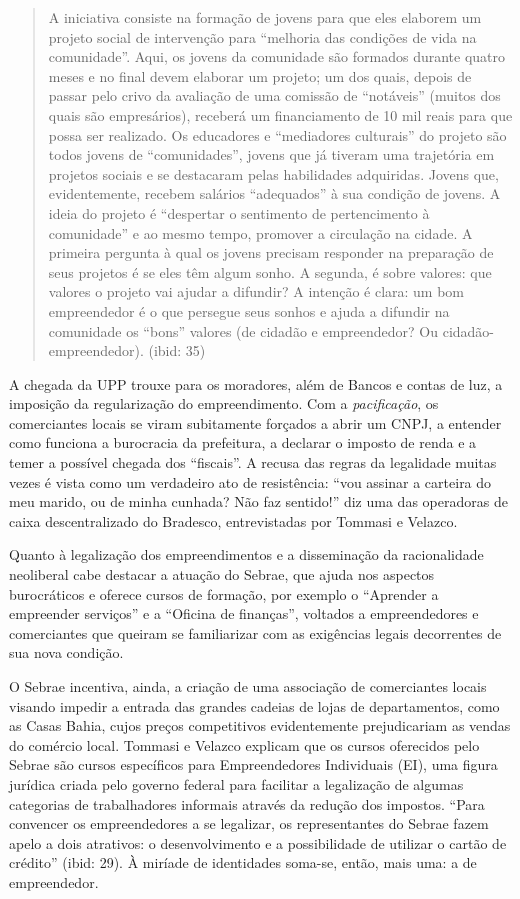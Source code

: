\begin{quote}
A iniciativa consiste na formação de jovens para que eles elaborem um
projeto social de intervenção para ``melhoria das condições de vida na
comunidade''. Aqui, os jovens da comunidade são formados durante quatro
meses e no final devem elaborar um projeto; um dos quais, depois de
passar pelo crivo da avaliação de uma comissão de ``notáveis'' (muitos
dos quais são empresários), receberá um financiamento de 10 mil reais
para que possa ser realizado. Os educadores e ``mediadores culturais''
do projeto são todos jovens de ``comunidades'', jovens que já tiveram
uma trajetória em projetos sociais e se destacaram pelas habilidades
adquiridas. Jovens que, evidentemente, recebem salários ``adequados'' à
sua condição de jovens. A ideia do projeto é ``despertar o sentimento de
pertencimento à comunidade'' e ao mesmo tempo, promover a circulação na
cidade. A primeira pergunta à qual os jovens precisam responder na
preparação de seus projetos é se eles têm algum sonho. A segunda, é
sobre valores: que valores o projeto vai ajudar a difundir? A intenção é
clara: um bom empreendedor é o que persegue seus sonhos e ajuda a
difundir na comunidade os ``bons'' valores (de cidadão e empreendedor?
Ou cidadão-empreendedor). (ibid: 35)
\end{quote}

A chegada da UPP trouxe para os moradores, além de Bancos e contas de
luz, a imposição da regularização do empreendimento. Com a
\emph{pacificação}, os comerciantes locais se viram subitamente forçados
a abrir um CNPJ, a entender como funciona a burocracia da prefeitura, a
declarar o imposto de renda e a temer a possível chegada dos
``fiscais''. A recusa das regras da legalidade muitas vezes é vista como
um verdadeiro ato de resistência: ``vou assinar a carteira do meu
marido, ou de minha cunhada? Não faz sentido!'' diz uma das operadoras
de caixa descentralizado do Bradesco, entrevistadas por Tommasi e
Velazco.

Quanto à legalização dos empreendimentos e a disseminação da
racionalidade neoliberal cabe destacar a atuação do Sebrae, que ajuda
nos aspectos burocráticos e oferece cursos de formação, por exemplo o
``Aprender a empreender serviços'' e a ``Oficina de finanças'', voltados
a empreendedores e comerciantes que queiram se familiarizar com as
exigências legais decorrentes de sua nova condição.

O Sebrae incentiva, ainda, a criação de uma associação de comerciantes
locais visando impedir a entrada das grandes cadeias de lojas de
departamentos, como as Casas Bahia, cujos preços competitivos
evidentemente prejudicariam as vendas do comércio local. Tommasi e
Velazco explicam que os cursos oferecidos pelo Sebrae são cursos
específicos para Empreendedores Individuais (EI), uma figura jurídica
criada pelo governo federal para facilitar a legalização de algumas
categorias de trabalhadores informais através da redução dos impostos.
``Para convencer os empreendedores a se legalizar, os representantes do
Sebrae fazem apelo a dois atrativos: o desenvolvimento e a possibilidade
de utilizar o cartão de crédito'' (ibid: 29). À miríade de identidades
soma-se, então, mais uma: a de empreendedor.

